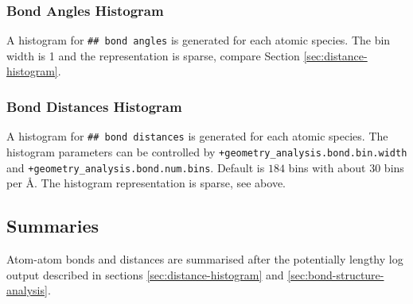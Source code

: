 \documentclass[oribibl]{llncs}
\newcommand{\ttt}[1]{\texttt{#1}}
\begin{document}
\subsubsection{Bond Angles Histogram} \label{sec:bond-angle-histogram}
A histogram for \ttt{\#\# bond angles} is generated for each atomic species.
The bin width is 1\degree{} and the representation is sparse,
compare Section \ref{sec:distance-histogram}.

\subsubsection{Bond Distances Histogram} \label{sec:bond-distance-histogram}
A histogram for \ttt{\#\# bond distances} is generated for each atomic species.
The histogram parameters can be controlled by 
\ttt{+geometry\_analysis.bond.bin.width} and 
\ttt{+geometry\_analysis.bond.num.bins}. Default is $184$ bins with about $30$ bins per \AA{}.
The histogram representation is sparse, see above.

\subsection{Summaries}
%
Atom-atom bonds and distances are summarised after the potentially lengthy log output described in
sections \ref{sec:distance-histogram} and \ref{sec:bond-structure-analysis}.
\end{document}

